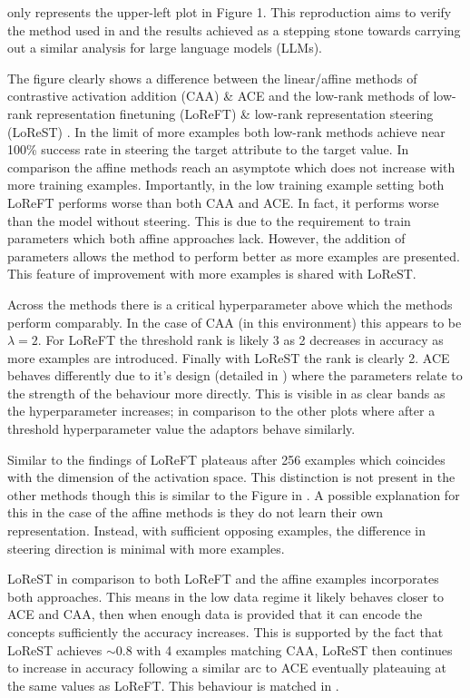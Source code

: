  only represents the upper-left plot in \cite{steering-clear} Figure 1.
This reproduction aims to verify the method used in \cite{steering-clear} and the results achieved as a stepping stone towards carrying out a similar analysis for large language models (LLMs).

The figure clearly shows a difference between the linear/affine methods of contrastive activation addition (CAA) \citep{caa} \& ACE and the low-rank methods of low-rank representation finetuning (LoReFT) \citep{reft} \& low-rank representation steering (LoReST) \citep{steering-clear}.
In the limit of more examples both low-rank methods achieve near 100\% success rate in steering the target attribute to the target value.
In comparison the affine methods reach an asymptote which does not increase with more training examples.
Importantly, in the low training example setting both LoReFT performs worse than both CAA and ACE.
In fact, it performs worse than the model without steering.
This is due to the requirement to train parameters which both affine approaches lack.
However, the addition of parameters allows the method to perform better as more examples are presented.
This feature of improvement with more examples is shared with LoReST.

Across the methods there is a critical hyperparameter above which the methods perform comparably.
In the case of CAA (in this environment) this appears to be $\lambda=2$.
For LoReFT the threshold rank is likely 3 as 2 decreases in accuracy as more examples are introduced.
Finally with LoReST the rank is clearly 2.
ACE behaves differently due to it's design (detailed in ) where the parameters relate to the strength of the behaviour more directly.
This is visible in  as clear bands as the hyperparameter increases; in comparison to the other plots where after a threshold hyperparameter value the adaptors behave similarly.

Similar to the findings of \citet{steering-clear} LoReFT plateaus after 256 examples which coincides with the dimension of the activation space.
This distinction is not present in the other methods though this is similar to the Figure in \citet{steering-clear}.
A possible explanation for this in the case of the affine methods is they do not learn their own representation.
Instead, with sufficient opposing examples, the difference in steering direction is minimal with more examples.

LoReST in comparison to both LoReFT and the affine examples incorporates both approaches.
This means in the low data regime it likely behaves closer to ACE and CAA, then when enough data is provided that it can encode the concepts sufficiently the accuracy increases.
This is supported by the fact that LoReST achieves $\sim 0.8$ with 4 examples matching CAA, LoReST then continues to increase in accuracy following a similar arc to ACE eventually plateauing at the same values as LoReFT.
This behaviour is matched in \citet{steering-clear}.

